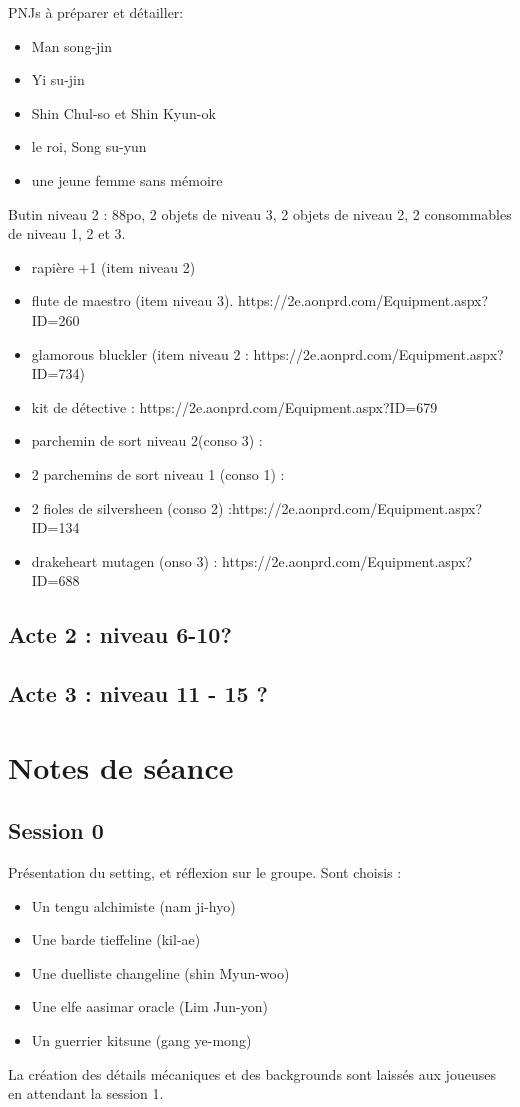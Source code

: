 \documentclass[10pt,a4paper]{book}
\begin{document}
PNJs à préparer et détailler:
\begin{itemize}
\item Man song-jin
\item Yi su-jin
\item Shin Chul-so et Shin Kyun-ok
\item le roi, Song su-yun
\item une jeune femme sans mémoire
\end{itemize}

Butin niveau 2 : 88po, 2 objets de niveau 3, 2 objets de niveau 2, 2 consommables de niveau 1, 2 et 3. 
\begin{itemize}
\item rapière +1 (item niveau 2)
\item flute de maestro (item niveau 3). https://2e.aonprd.com/Equipment.aspx?ID=260
\item glamorous bluckler (item niveau 2 : https://2e.aonprd.com/Equipment.aspx?ID=734)
\item kit de détective : https://2e.aonprd.com/Equipment.aspx?ID=679
\item parchemin de sort niveau 2(conso 3) :
\item 2 parchemins de sort niveau 1 (conso 1) :
\item 2 fioles de silversheen (conso 2) :https://2e.aonprd.com/Equipment.aspx?ID=134
\item drakeheart mutagen (onso 3) : https://2e.aonprd.com/Equipment.aspx?ID=688
\end{itemize}
\section{Acte 2 : niveau 6-10?}

\section{Acte 3 : niveau 11 - 15 ?}
\chapter{Notes de séance}
\section{Session 0}
Présentation du setting, et réflexion sur le groupe. Sont choisis :
\begin{itemize}
\item Un tengu alchimiste (nam ji-hyo)
\item Une barde tieffeline (kil-ae)
\item Une duelliste changeline (shin Myun-woo)
\item Une elfe aasimar oracle (Lim Jun-yon)
\item Un guerrier kitsune (gang ye-mong)
\end{itemize}
La création des détails mécaniques et des backgrounds sont laissés aux joueuses en attendant la session 1.
\end{document}
